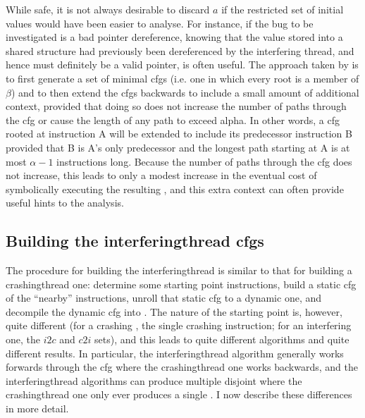 While safe, it is not always desirable to discard $a$ if the
restricted set of initial values would have been easier to analyse.
For instance, if the bug to be investigated is a bad pointer
dereference, knowing that the value stored into a shared structure had
previously been dereferenced by the interfering thread, and hence must
definitely be a valid pointer, is often useful.  The approach taken by
{\implementation} is to first generate a set of minimal \glspl{cfg}
(i.e. one in which every root is a member of $\beta$) and to then
extend the \glspl{cfg} backwards to include a small amount of
additional context, provided that doing so does not increase the number
of paths through the \gls{cfg} or cause the length of any path to
exceed \gls{alpha}.  In other words, a \gls{cfg} rooted at instruction
A will be extended to include its predecessor instruction B provided
that B is A's only predecessor and the longest path starting at A is
at most $\alpha - 1$ instructions long.  Because the number of paths
through the \gls{cfg} does not increase, this leads to only a modest
increase in the eventual cost of symbolically executing the resulting
{\StateMachine}, and this extra context can often provide useful hints
to the analysis.

\subsection[Building the \glsentrytext{interferingthread} \glsentrytext{cfg}s]{Building the \gls{interferingthread} \glspl{cfg}}

The procedure for building the \gls{interferingthread}
{\StateMachines} is similar to that for building a
\gls{crashingthread} one: determine some starting point instructions,
build a \gls{static cfg} of the ``nearby'' instructions, unroll that
\gls{static cfg} to a dynamic one, and decompile the \gls{dynamic cfg}
into {\AStateMachine}.  The nature of the starting point is, however,
quite different (for a crashing {\StateMachine}, the single crashing
instruction; for an interfering one, the $i2c$ and $c2i$ sets), and
this leads to quite different algorithms and quite different results.
In particular, the \gls{interferingthread} algorithm generally works
forwards through the \gls{cfg} where the \gls{crashingthread} one
works backwards, and the \gls{interferingthread} algorithms can
produce multiple disjoint {\StateMachines} where the
\gls{crashingthread} one only ever produces a single {\StateMachine}.
I now describe these differences in more detail.

